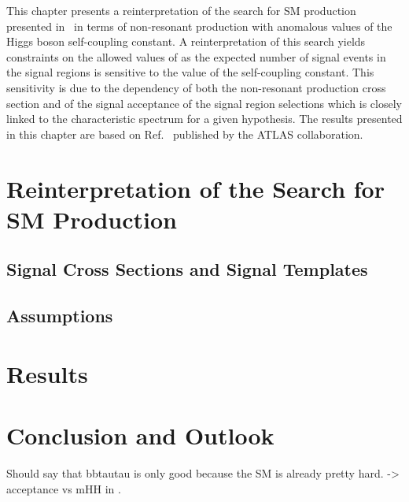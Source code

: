 This chapter presents a reinterpretation of the search for SM \HH
production presented in~ in terms of non-resonant
\HH production with anomalous values of the Higgs boson self-coupling
constant. A reinterpretation of this search yields constraints on the
allowed values of \klambda as the expected number of signal events in
the signal regions is sensitive to the value of the self-coupling
constant. This sensitivity is due to the \klambda dependency of both
the non-resonant \HH production cross section and of the signal
acceptance of the signal region selections which is closely linked to
the characteristic \mHH spectrum for a given \klambda hypothesis. The
results presented in this chapter are based on
Ref.~\cite{ATLAS-CONF-2021-052} published by the ATLAS collaboration.


\section{Reinterpretation of the Search for SM \HH Production}

\subsection{Signal Cross Sections and Signal Templates}

\subsection{Assumptions}

\section{Results}

\section{Conclusion and Outlook}


Should say that bbtautau is only good because the SM is already pretty
hard. -> acceptance vs mHH in \hadhad.


